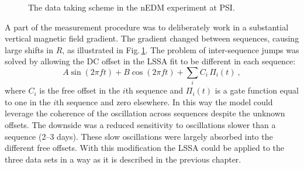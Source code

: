 \begin{figure}
  \centering
  \quad
  \caption{The data taking scheme in the nEDM experiment at PSI\@. }\label{fig:oscillating_nEDM_in_R}
\end{figure}

A part of the measurement procedure was to deliberately work in a substantial vertical magnetic field gradient. The gradient changed between sequences, causing large shifts in $R$, as illustrated in Fig.\,\ref{fig:oscillating_nEDM_in_R}. The problem of inter-sequence jumps was solved by allowing the DC offset in the LSSA fit to be different in each sequence:
\begin{equation}
  \label{eq:axions_LSSA}
  A\sin(2 \pi f t) + B\cos(2 \pi f t) + \sum_i C_i\,\Pi_i(t) \ ,
\end{equation}
where $C_i$ is the free offset in the $i$th sequence and $\Pi_i(t)$ is a gate function equal to one in the $i$th sequence and zero elsewhere. In this way the model could leverage the coherence of the oscillation across sequences despite the unknown offsets. The downside was a reduced sensitivity to oscillations slower than a sequence (2--3 days). These slow oscillations were largely absorbed into the different free offsets. With this modification the LSSA could be applied to the three data sets in a way as it is described in the previous chapter.

